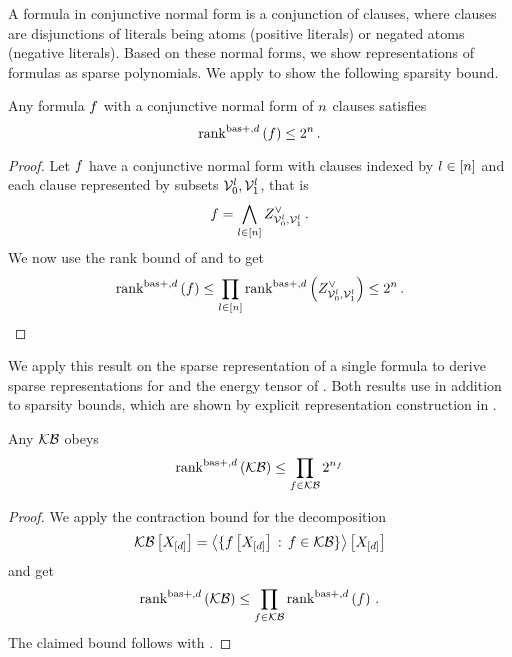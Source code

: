 A formula in conjunctive normal form is a conjunction of clauses, where clauses are disjunctions of literals being atoms (positive literals) or negated atoms (negative literals).
Based on these normal forms, we show representations of formulas as sparse polynomials. %
We apply  to show the following sparsity bound. %

\begin{theorem}
    \label{the:formulaSlicePolynomialDecomposition}
    Any formula $f$ with a conjunctive normal form of $n$ clauses satisfies
    \[ \mathrm{rank}^{\mathrm{bas+},d}\left(f\right) \leq 2^{n} \, . \]
\end{theorem}
\begin{proof}
    Let $f$ have a conjunctive normal form with clauses indexed by $l\in[n]$ and each clause represented by subsets $\mathcal{V}_0^l, \mathcal{V}_1^l$, that is
    \[ f = \bigwedge_{l\in[n]} Z^{\lor}_{\mathcal{V}_0^l,\mathcal{V}_1^l} \, . \]
    We now use the rank bound of  and  to get
    \begin{align*}
        \mathrm{rank}^{\mathrm{bas+},d}\left(f\right) \leq \prod_{l\in[n]} \mathrm{rank}^{\mathrm{bas+},d}\left(Z^{\lor}_{\mathcal{V}_0^l,\mathcal{V}_1^l}\right) \leq 2^{n} \, .
    \end{align*}
\end{proof}

We apply this result on the sparse representation of a single formula to derive sparse representations for \HardLogicNetworks{} and the energy tensor of \HybridLogicNetworks{}.
Both results use in addition to  sparsity bounds, which are shown by explicit representation construction in .

\begin{corollary}
    Any \HardLogicNetwork{} $\mathcal{KB}$ obeys
    \begin{align*}
        \mathrm{rank}^{\mathrm{bas+},d}\left(\mathcal{KB}\right) \leq \prod_{f\in\mathcal{KB}} 2^{n_{f}}
    \end{align*}
\end{corollary}
\begin{proof}
    We apply the contraction bound  for the decomposition
    \begin{align*}
        \mathcal{KB}\left[X_{[d]}\right] = \left\langle \{f\left[X_{[d]}\right] \,:\, f\in\mathcal{KB}\}\right\rangle \left[ X_{[d]} \right]
    \end{align*}
    and get
    \begin{align*}
        \mathrm{rank}^{\mathrm{bas+},d}\left(\mathcal{KB}\right) \leq \prod_{f\in\mathcal{KB}} \mathrm{rank}^{\mathrm{bas+},d}\left(f\right) \, .
    \end{align*}
    The claimed bound follows with .
\end{proof}

